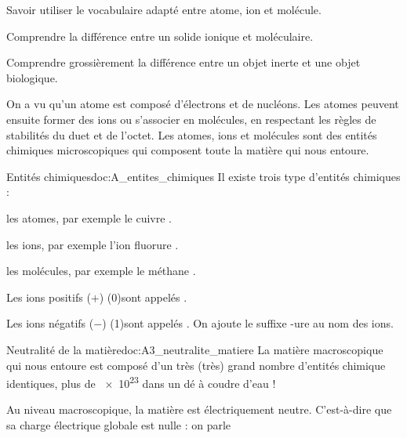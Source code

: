 \teteSndMole

\vspace*{-32pt}


\begin{objectifs}
  \item Savoir utiliser le vocabulaire adapté entre atome, ion et molécule.
  \item Comprendre la différence entre un solide ionique et moléculaire.
  \item Comprendre grossièrement la différence entre un objet inerte et une objet biologique.
\end{objectifs}

\begin{contexte}
  On a vu qu'un atome est composé d'électrons et de nucléons.
  Les atomes peuvent ensuite former des ions ou s'associer en molécules, en respectant les règles de stabilités du duet et de l'octet.
  Les atomes, ions et molécules sont des entités chimiques microscopiques qui composent toute la matière qui nous entoure.

  
  
\end{contexte}



\begin{doc}{Entités chimiques}{doc:A_entites_chimiques}
  Il existe trois type d'entités chimiques :
  \begin{listePoints}
    \item les atomes, par exemple le cuivre .
    \item les ions, par exemple l'ion fluorure .
    \item les molécules, par exemple le méthane .
  \end{listePoints}
  
  \begin{importants}
    Les ions positifs ($+$) \texteTrou(0){sont appelés .}
    
    Les ions négatifs ($-$) \texteTrou(1){sont appelés . On ajoute le suffixe -ure au nom des ions.}
  \end{importants}
\end{doc}

\begin{doc}{Neutralité de la matière}{doc:A3_neutralite_matiere}
  La matière macroscopique qui nous entoure est composé d'un très (très) grand nombre d'entités chimique identiques, plus de \num{e23} dans un dé à coudre d'eau !
  
  \begin{importants}
    Au niveau macroscopique, la matière est électriquement neutre.
    C'est-à-dire que sa charge électrique globale est nulle : on parle 
  \end{importants}
\end{doc}

